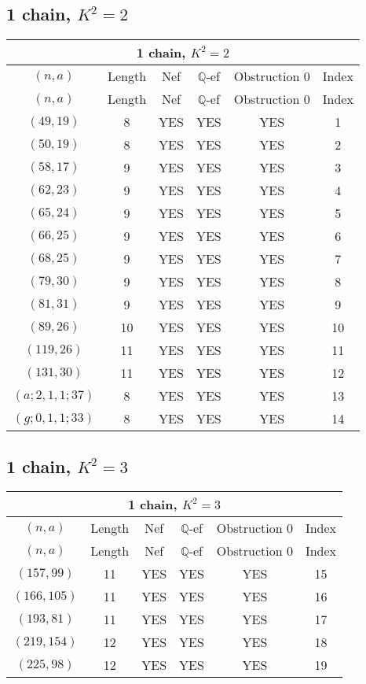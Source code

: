 \subsection{1 chain, $K^2 = 2$}
\begin{longtable}{|c|c|c|c|c|c|}
\hline
\multicolumn{6}{|c|}{1 chain, $K^2 = 2$}\\
\hline
$(n,a)$ & Length & Nef & $\mathbb Q$-ef & Obstruction 0 & Index\\
\hline
\endfirsthead

\hline
$(n,a)$ & Length & Nef & $\mathbb Q$-ef & Obstruction 0 & Index\\
\hline
\endhead
\hline
\endfoot

$(49, 19)$ & 8 & YES & YES & YES & 1\\
$(50, 19)$ & 8 & YES & YES & YES & 2\\
$(58, 17)$ & 9 & YES & YES & YES & 3\\
$(62, 23)$ & 9 & YES & YES & YES & 4\\
$(65, 24)$ & 9 & YES & YES & YES & 5\\
$(66, 25)$ & 9 & YES & YES & YES & 6\\
$(68, 25)$ & 9 & YES & YES & YES & 7\\
$(79, 30)$ & 9 & YES & YES & YES & 8\\
$(81, 31)$ & 9 & YES & YES & YES & 9\\
$(89, 26)$ & 10 & YES & YES & YES & 10\\
$(119, 26)$ & 11 & YES & YES & YES & 11\\
$(131, 30)$ & 11 & YES & YES & YES & 12\\
$(a; 2, 1, 1; 37)$ & 8 & YES & YES & YES & 13\\
$(g; 0, 1, 1; 33)$ & 8 & YES & YES & YES & 14
\end{longtable}
\subsection{1 chain, $K^2 = 3$}
\begin{longtable}{|c|c|c|c|c|c|}
\hline
\multicolumn{6}{|c|}{1 chain, $K^2 = 3$}\\
\hline
$(n,a)$ & Length & Nef & $\mathbb Q$-ef & Obstruction 0 & Index\\
\hline
\endfirsthead

\hline
$(n,a)$ & Length & Nef & $\mathbb Q$-ef & Obstruction 0 & Index\\
\hline
\endhead
\hline
\endfoot

$(157, 99)$ & 11 & YES & YES & YES & 15\\
$(166, 105)$ & 11 & YES & YES & YES & 16\\
$(193, 81)$ & 11 & YES & YES & YES & 17\\
$(219, 154)$ & 12 & YES & YES & YES & 18\\
$(225, 98)$ & 12 & YES & YES & YES & 19
\end{longtable}
